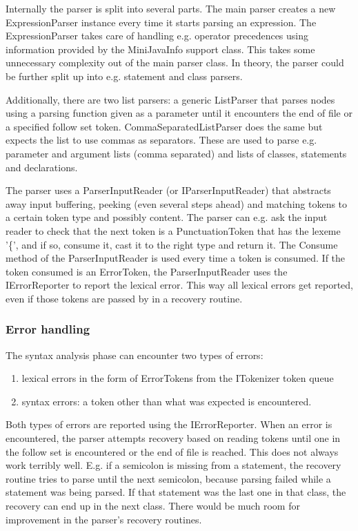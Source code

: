 \documentclass[a4paper,11pt]{article}
\begin{document}
Internally the parser is split into several parts. The main parser creates a new ExpressionParser instance every time it starts parsing an expression. The ExpressionParser takes care of handling e.g. operator precedences using information provided by the MiniJavaInfo support class. This takes some unnecessary complexity out of the main parser class. In theory, the parser could be further split up into e.g. statement and class parsers.

Additionally, there are two list parsers: a generic ListParser that parses nodes using a parsing function given as a parameter until it encounters the end of file or a specified follow set token. CommaSeparatedListParser does the same but expects the list to use commas as separators. These are used to parse e.g. parameter and argument lists (comma separated) and lists of classes, statements and declarations.

The parser uses a ParserInputReader (or IParserInputReader) that abstracts away input buffering, peeking (even several steps ahead) and matching tokens to a certain token type and possibly content. The parser can e.g. ask the input reader to check that the next token is a PunctuationToken that has the lexeme '\{', and if so, consume it, cast it to the right type and return it. The Consume method of the ParserInputReader is used every time a token is consumed. If the token consumed is an ErrorToken, the ParserInputReader uses the IErrorReporter to report the lexical error. This way all lexical errors get reported, even if those tokens are passed by in a recovery routine.

\subsubsection{Error handling}

The syntax analysis phase can encounter two types of errors:
\begin{enumerate}
\item lexical errors in the form of ErrorTokens from the ITokenizer token queue
\item syntax errors: a token other than what was expected is encountered.
\end{enumerate}

Both types of errors are reported using the IErrorReporter. When an error is encountered, the parser attempts recovery based on reading tokens until one in the follow set is encountered or the end of file is reached. This does not always work terribly well. E.g. if a semicolon is missing from a statement, the recovery routine tries to parse until the next semicolon, because parsing failed while a statement was being parsed. If that statement was the last one in that class, the recovery can end up in the next class. There would be much room for improvement in the parser's recovery routines.
\end{document}

